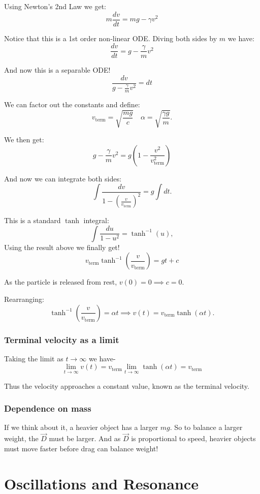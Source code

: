 Using Newton's 2nd Law we get: 
$$
m\frac{dv}{dt} = mg - \gamma v^2
$$

Notice that this is a 1st order non-linear ODE. Diving both sides by $m$ we have: 
$$
\frac{dv}{dt} = g - \frac{\gamma}{m}v^2
$$

And now this is a separable ODE! 
$$
\frac{dv}{g - \frac{\gamma}{m}v^2} = dt
$$

We can factor out the constants and define: 
$$
v_{\text{term}} = \sqrt{\frac{mg}{c}}
\quad
\alpha = \sqrt{\frac{\gamma g}{m}}.
$$

We then get: 
$$
g - \frac{\gamma}{m}v^2
= g\left(1 - \frac{v^2}{v_{\text{term}}^2}\right)
$$

And now we can integrate both sides: 
$$
\int \frac{dv}{1 - \left(\frac{v}{v_{\text{term}}}\right)^2}
= g\int dt.
$$

This is a standard $\tanh$ integral: 
$$
\int \frac{du}{1-u^2} = \tanh^{-1}(u),
$$
Using the result above we finally get! 
$$
v_{\text{term}}\tanh^{-1}\!\left(\frac{v}{v_{\text{term}}}\right)
= gt + c
$$

As the particle is released from rest, $v(0)=0 \implies c=0$.

Rearranging:
$$
\tanh^{-1}\!\left(\frac{v}{v_{\text{term}}}\right)
= \alpha t \implies 
\boxed{
v(t) = v_{\text{term}}\tanh(\alpha t)
}.
$$

\subsection{Terminal velocity as a limit}

Taking the limit as $t\to\infty$ we have- 
$$
\lim_{t\to\infty} v(t)
= v_{\text{term}}\lim_{t\to\infty}\tanh(\alpha t)
= v_{\text{term}}
$$

Thus the velocity approaches a constant value, known as the terminal velocity.

\subsection{Dependence on mass}

If we think about it, a heavier object has a larger $mg$. So to balance a larger weight, the $\vec{D}$ must be larger. And as $\vec{D}$ is proportional to speed, heavier objects must move faster before drag can balance weight! 


\chapter{Oscillations and Resonance}

